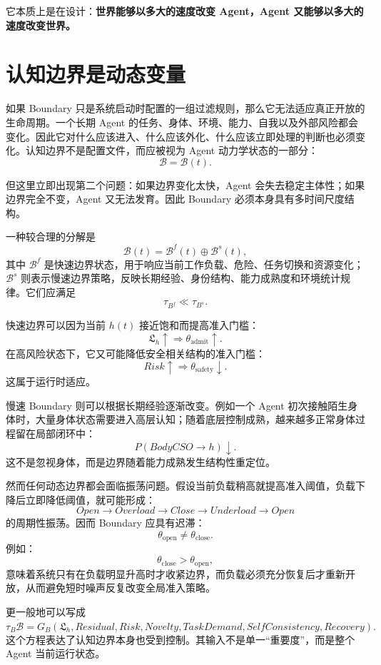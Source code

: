 它本质上是在设计：\textbf{世界能够以多大的速度改变 Agent，Agent 又能够以多大的速度改变世界。}


\section{认知边界是动态变量}

如果 Boundary 只是系统启动时配置的一组过滤规则，那么它无法适应真正开放的生命周期。一个长期 Agent 的任务、身体、环境、能力、自我以及外部风险都会变化。因此它对什么应该进入、什么应该外化、什么应该立即处理的判断也必须变化。认知边界不是配置文件，而应被视为 Agent 动力学状态的一部分：
\[
\boxed{
\mathcal{B}
=
\mathcal{B}(t).
}
\]

但这里立即出现第二个问题：如果边界变化太快，Agent 会失去稳定主体性；如果边界完全不变，Agent 又无法发育。因此 Boundary 必须本身具有多时间尺度结构。

一种较合理的分解是
\[
\mathcal{B}(t)
=
\mathcal{B}^{f}(t)
\oplus
\mathcal{B}^{s}(t),
\]
其中 $\mathcal{B}^{f}$ 是快速边界状态，用于响应当前工作负载、危险、任务切换和资源变化；$\mathcal{B}^{s}$ 则表示慢速边界策略，反映长期经验、身份结构、能力成熟度和环境统计规律。它们应满足
\[
\tau_{B^f}
\ll
\tau_{B^s}.
\]

快速边界可以因为当前 $h(t)$ 接近饱和而提高准入门槛：
\[
\mathfrak{L}_h
\uparrow
\Rightarrow
\theta_{\mathrm{admit}}
\uparrow.
\]
在高风险状态下，它又可能降低安全相关结构的准入门槛：
\[
Risk
\uparrow
\Rightarrow
\theta_{\mathrm{safety}}
\downarrow.
\]
这属于运行时适应。

慢速 Boundary 则可以根据长期经验逐渐改变。例如一个 Agent 初次接触陌生身体时，大量身体状态需要进入高层认知；随着底层控制成熟，越来越多正常身体过程留在局部闭环中：
\[
P(
BodyCSO
\rightarrow h
)
\downarrow.
\]
这不是忽视身体，而是边界随着能力成熟发生结构性重定位。

然而任何动态边界都会面临振荡问题。假设当前负载稍高就提高准入阈值，负载下降后立即降低阈值，就可能形成：
\[
Open
\rightarrow
Overload
\rightarrow
Close
\rightarrow
Underload
\rightarrow
Open
\]
的周期性振荡。因而 Boundary 应具有迟滞：
\[
\theta_{\mathrm{open}}
\neq
\theta_{\mathrm{close}}.
\]
例如：
\[
\theta_{\mathrm{close}}
>
\theta_{\mathrm{open}},
\]
意味着系统只有在负载明显升高时才收紧边界，而负载必须充分恢复后才重新开放，从而避免短时噪声反复改变全局准入策略。

更一般地可以写成
\[
\tau_B
\dot{\mathcal B}
=
G_B
\left(
\mathfrak L_h,
Residual,
Risk,
Novelty,
TaskDemand,
SelfConsistency,
Recovery
\right).
\]
这个方程表达了认知边界本身也受到控制。其输入不是单一“重要度”，而是整个 Agent 当前运行状态。

